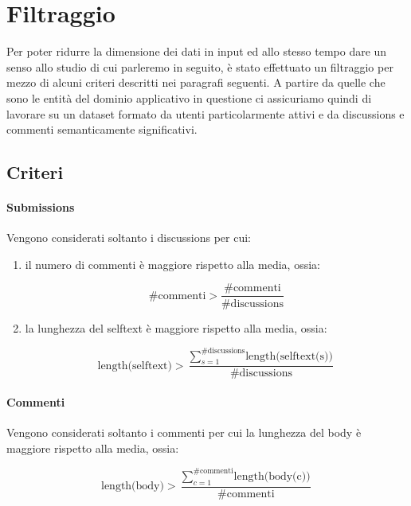 \section{Filtraggio}

Per poter ridurre la dimensione dei dati in input ed allo stesso tempo dare un senso allo studio di cui parleremo in seguito, {\`e} stato effettuato un filtraggio per mezzo di alcuni criteri descritti nei paragrafi seguenti. A partire da quelle che sono le entit{\`a} del dominio applicativo in questione ci assicuriamo quindi di lavorare su un dataset formato da utenti particolarmente attivi e da discussions e commenti semanticamente significativi.

\subsection{Criteri}

\paragraph{Submissions}
Vengono considerati soltanto i discussions per cui:

\begin{enumerate}[label=(\roman*)]

\item
il numero di commenti {\`e} maggiore rispetto alla media, ossia:

\begin{equation}
\label{eq:1.1}
\text{\# commenti}>\frac{\text{\# commenti}}{\text{\# discussions}}
\end{equation}

\item
la lunghezza del selftext {\`e} maggiore rispetto alla media, ossia:

\begin{equation}
\label{eq:1.2}
\text{length(selftext)}>\frac{\sum_{s=1}^{\text{\# discussions}} \text{length(selftext(s))}}{\text{\# discussions}}
\end{equation}

\end{enumerate}

\paragraph{Commenti}
Vengono considerati soltanto i commenti per cui la lunghezza del body {\`e} maggiore rispetto alla media, ossia:

\begin{equation}
\text{length(body)}>\frac{\sum_{c=1}^{\text{\# commenti}} \text{length(body(c))}}{\text{\# commenti}}
\end{equation}

